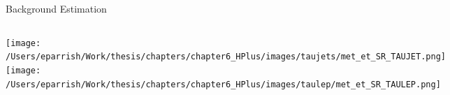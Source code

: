 \documentclass[aspectratio=169,xcolor=table]{beamer}
\begin{document}
\begin{frame}[t]{Background Estimation}
\begin{columns}
      \centering
      \texttt{[image: /Users/eparrish/Work/thesis/chapters/chapter6\_HPlus/images/taujets/met\_et\_SR\_TAUJET.png]}
      \texttt{[image: /Users/eparrish/Work/thesis/chapters/chapter6\_HPlus/images/taulep/met\_et\_SR\_TAULEP.png]}
    \end{columns}
  \end{frame}
\end{document}

